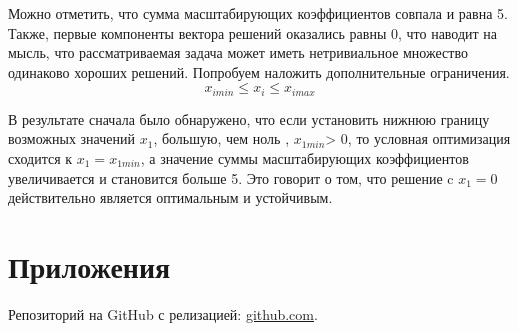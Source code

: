 \documentclass[12pt,a4paper]{scrartcl}
\begin{document}
Можно отметить, что сумма масштабирующих коэффициентов совпала и равна 5. \\
Также, первые компоненты вектора решений оказались равны 0, что  наводит на мысль, что рассматриваемая задача может иметь нетривиальное множество одинаково хороших решений. Попробуем наложить дополнительные ограничения. 
\begin{equation}
x_{i min} \leq x_i \leq x_{i max}
\end{equation}

В результате сначала было обнаружено, что если установить нижнюю границу возможных
значений $x_1$, большую, чем ноль , $x_{1min}$> 0, то условная оптимизация сходится к $x_1 = x_{1min}$, а значение суммы масштабирующих коэффициентов увеличивается и становится больше 5. Это говорит о том, что решение c $x_1 = 0$ действительно является оптимальным и устойчивым.



\section{Приложения}
Репозиторий на GitHub с релизацией: \href{https://github.com/WiillyWonka/Intervals}{github.com}.
\end{document}
